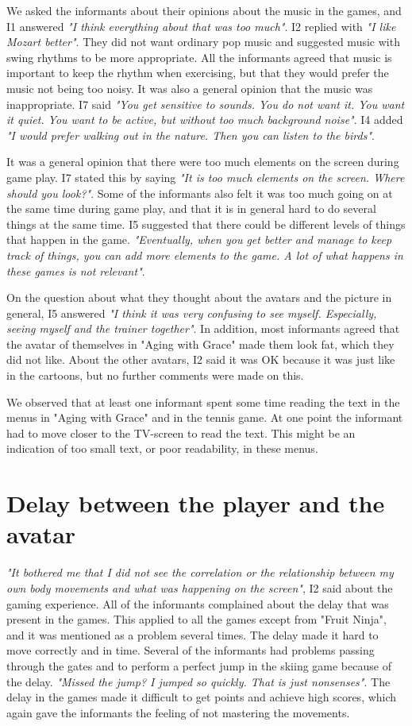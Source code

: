 We asked the informants about their opinions about the music in the games, and I1 answered \emph{"I think everything about that was too much"}. I2 replied with \emph{"I like Mozart better"}. They did not want ordinary pop music and suggested music with swing rhythms to be more appropriate. All the informants agreed that music is important to keep the rhythm when exercising, but that they would prefer the music not being too noisy. It was also a general opinion that the music was inappropriate.  I7 said \emph{"You get sensitive to sounds. You do not want it. You want it quiet. You want to be active, but without too much background noise"}. I4 added \emph{"I would prefer walking out in the nature. Then you can listen to the birds"}.

It was a general opinion that there were too much elements on the screen during game play. I7 stated this by saying \emph{"It is too much elements on the screen. Where should you look?"}. Some of the informants also felt it was too much going on at the same time during game play, and that it is in general hard to do several things at the same time. I5 suggested that there could be different levels of things that happen in the game.  \emph{"Eventually, when you get better and manage to keep track of things, you can add more elements to the game. A lot of what happens in these games is not relevant"}. 

On the question about what they thought about the avatars and the picture in general, I5 answered \emph{"I think it was very confusing to see myself. Especially, seeing myself and the trainer together"}. In addition, most informants agreed that the avatar of themselves in "Aging with Grace" made them look fat, which they did not like. About the other avatars, I2 said it was OK because it was just like in the cartoons, but no further comments were made on this.  

We observed that at least one informant spent some time reading the text in the menus in "Aging with Grace" and in the tennis game. At one point the informant had to move closer to the TV-screen to read the text. This might be an indication of too small text, or poor readability, in these menus. 

\section{Delay between the player and the avatar}

\emph{"It bothered me that I did not see the correlation or the relationship between my own body movements and what was happening on the screen"}, I2 said about the gaming experience. All of the informants complained about the delay that was present in the games. This applied to all the games except from "Fruit Ninja", and it was mentioned as a problem several times. The delay made it hard to move correctly and in time. Several of the informants had problems passing through the gates and to perform a perfect jump in the skiing game because of the delay. \emph{"Missed the jump? I jumped so quickly. That is just nonsenses"}. The delay in the games made it difficult to get points and achieve high scores, which again gave the informants the feeling of not mastering the movements. 

